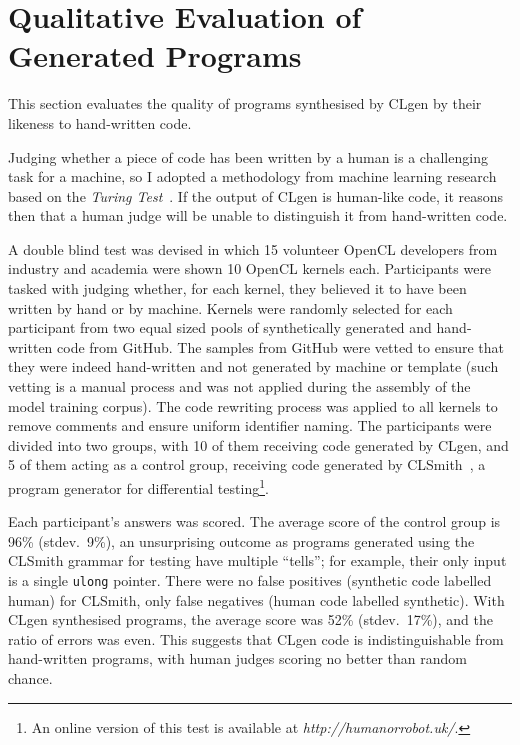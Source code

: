 \section{Qualitative Evaluation of Generated Programs}
\label{sec:clgen-qualitative-evaluation}

This section evaluates the quality of programs synthesised by CLgen by their likeness to hand-written code.

Judging whether a piece of code has been written by a human is a challenging task for a machine, so I adopted a methodology from machine learning research based on the \emph{Turing Test}~\cite{Gao2015a,Zhang2016,Vinyals}. If the output of CLgen is human-like code, it reasons then that a human judge will be unable to distinguish it from hand-written code.

A double blind test was devised in which 15 volunteer OpenCL developers from industry and academia were shown 10 OpenCL kernels each. Participants were tasked with judging whether, for each kernel, they believed it to have been written by hand or by machine. Kernels were randomly selected for each participant from two equal sized pools of synthetically generated and hand-written code from GitHub. The samples from GitHub were vetted to ensure that they were indeed hand-written and not generated by machine or template (such vetting is a manual process and was not applied during the assembly of the model training corpus). The code rewriting process was applied to all kernels to remove comments and ensure uniform identifier naming. The participants were divided into two groups, with 10 of them receiving code generated by CLgen, and 5 of them acting as a control group, receiving code generated by CLSmith~\cite{Lidbury2015a}, a program generator for differential testing\footnote{An online version of this test is available at \emph{http://humanorrobot.uk/}.}.

Each participant's answers was scored. The average score of the control group is 96\% (stdev.\ 9\%), an unsurprising outcome as programs generated using the CLSmith grammar for testing have multiple ``tells''; for example, their only input is a single \texttt{ulong} pointer. There were no false positives (synthetic code labelled human) for CLSmith, only false negatives (human code labelled synthetic). With CLgen synthesised programs, the average score was 52\% (stdev.\ 17\%), and the ratio of errors was even. This suggests that CLgen code is indistinguishable from hand-written programs, with human judges scoring no better than random chance.